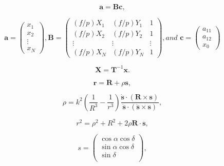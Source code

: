 \documentclass{article}
\begin{document}
\begin{equation}
\textbf{a}=\textbf{B}\textbf{c} ,
\label{eq:9}
\end{equation}



\begin{equation}
\textbf{a}=
\begin{pmatrix}
x_{1}\\
x_{2}\\
\vdots \\
x_{N}
\end{pmatrix}
,
\textbf{B}=
\begin{pmatrix}
(f/p)X_{1} & (f/p)Y_{1} & 1 \\
(f/p)X_{2} & (f/p)Y_{2} & 1 \\ 
\vdots & \vdots &  \vdots \\
(f/p)X_{N} & (f/p)Y_{N} & 1
\end{pmatrix}
, and \textbf{ c}=
\begin{pmatrix}
a_{11}\\
a_{12} \\    
x_{0}
\end{pmatrix}
\end{equation}




\begin{equation}
\textbf{X}=\textbf{T}^{-1}\textbf{x}   .
\label{eq:ta_inv}
\end{equation}


\begin{equation}
\textbf{r}=\textbf{R}+\textbf{$\rho$s} ,
\label{main}
\end{equation}


\begin{equation}
\rho = k^{2}\left(\frac{1}{R^{3}}-\frac{1}{r^{3}}\right)\frac{\dot{
    \textbf{s}}\cdot(\textbf{R}\times\textbf{s})}{\dot{ \textbf{s}}\cdot(\ddot{\textbf{s}}\times\textbf{s})},
\end{equation}

\begin{equation}
r^{2}=\rho^{2}+R^{2}+2\rho \textbf{R}\cdot \textbf{s} ,
\end{equation}



\begin{equation}
s=
\begin{pmatrix}
\cos \alpha \cos \delta\\  
\sin \alpha \cos \delta\\
\sin \delta \\ 
\end{pmatrix} ,
\end{equation}
\end{document}

